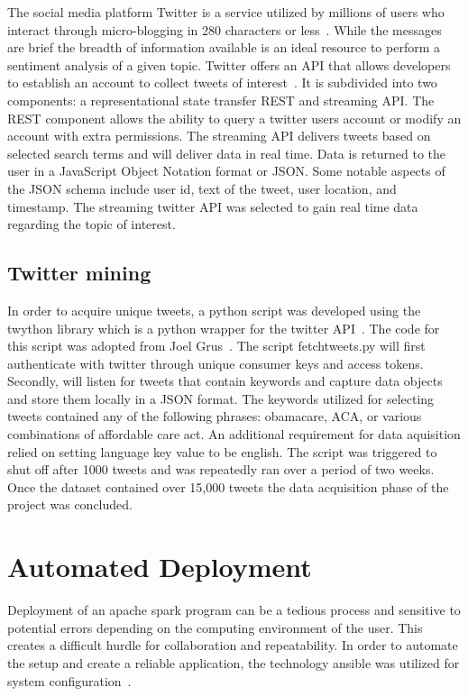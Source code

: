 The social media platform Twitter is a service utilized by millions of
users who interact through micro-blogging in 280 characters or
less~\cite{www-statista}.  While the messages are brief the breadth of
information available is an ideal resource to perform a sentiment
analysis of a given topic.  Twitter offers an API that allows
developers to establish an account to collect tweets of
interest~\cite{www-twitterapi}.  It is subdivided into two components:
a representational state transfer REST and streaming API.  The REST
component allows the ability to query a twitter users account or
modify an account with extra permissions.  The streaming API delivers
tweets based on selected search terms and will deliver data in real
time.  Data is returned to the user in a JavaScript Object Notation
format or JSON.  Some notable aspects of the JSON schema include user
id, text of the tweet, user location, and timestamp.  The streaming twitter API
was selected to gain real time data regarding the topic of interest.

\subsection{Twitter mining}

In order to acquire unique tweets, a python script was developed using
the twython library which is a python wrapper for the twitter
API~\cite{www-twy}.  The code for this script was adopted from Joel
Grus~\cite{www-fetchtweet}.  The script fetchtweets.py will first
authenticate with twitter through unique consumer keys and access
tokens.  Secondly, will listen for tweets that contain keywords and
capture data objects and store them locally in a JSON format.  The
keywords utilized for selecting tweets contained any of the following
phrases: obamacare, ACA, or various combinations of affordable care
act.  An additional requirement for data aquisition relied on setting
language key value to be english.  The script was triggered to shut
off after 1000 tweets and was repeatedly ran over a period of two
weeks.  Once the dataset contained over 15,000 tweets the data
acquisition phase of the project was concluded.


\section{Automated Deployment}

Deployment of an apache spark program can be a tedious process and
sensitive to potential errors depending on the computing environment
of the user.  This creates a difficult hurdle for collaboration and
repeatability.  In order to automate the setup and create a reliable
application, the technology ansible was utilized for system
configuration~\cite{www-ansibleweb}.


